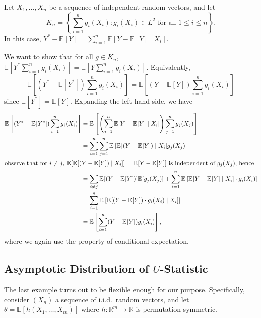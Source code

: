 \begin{eg}\label{eg:projection}
	Let \(X_1, \dots , X_n\) be a sequence of independent random vectors, and let
	\[
		K_n = \left\{ \sum_{i=1}^{n} g_i(X_i) \colon g_i(X_i) \in L^2 \text{ for all } 1 \leq i \leq n \right\}.
	\]
	In this case, \(Y^{\ast} - \mathbb{E}_{}[Y] = \sum_{i=1}^{n} \mathbb{E}_{}[Y - \mathbb{E}_{}[Y] \mid X_i] \).
\end{eg}
\begin{explanation}
	We want to show that for all \(g \in K_n\), \(\mathbb{E}_{}[Y^{\ast} \sum_{i=1}^{n} g_i(X_i)] = \mathbb{E}_{}[Y \sum_{i=1}^{n} g_i(X_i)] \). Equivalently,
	\[
		\mathbb{E}_{}\left[(Y^{\ast} - \mathbb{E}_{}[Y^{\ast} ] ) \sum_{i=1}^{n} g_i(X_i)\right]
		= \mathbb{E}_{}\left[(Y - \mathbb{E}_{}[Y] ) \sum_{i=1}^{n} g_i(X_i)\right]
	\]
	since \(\mathbb{E}_{}[Y^{\ast} ] = \mathbb{E}_{}[Y] \). Expanding the left-hand side, we have
	\begin{align*}
		\mathbb{E}_{}\left[(Y^{\ast} - \mathbb{E}_{}[Y^{\ast} ] ) \sum_{i=1}^{n} g_i(X_i)\right]
		 & = \mathbb{E}_{}\left[\left( \sum_{i=1}^{n} \mathbb{E}_{}[Y - \mathbb{E}_{}[Y] \mid X_i] \right) \sum_{j=1}^{n} g_j(X_j)\right]                                                            \\
		 & = \sum_{i=1}^{n} \sum_{j=1}^{n} \mathbb{E}_{}\left[\mathbb{E}_{}[(Y - \mathbb{E}_{}[Y] ) \mid X_i] g_j(X_j) \right]                                                                       \\
		\shortintertext{observe that for \(i\neq j\), \(\mathbb{E}_{}[\mathbb{E}_{}[(Y - \mathbb{E}_{}[Y] ) \mid X_i ]] = \mathbb{E}_{}[Y - \mathbb{E}_{}[Y] ] \) is independent of \(g_j(X_j)\), hence}
		 & = \sum_{i \neq j} \mathbb{E}_{}[(Y - \mathbb{E}_{}[Y] ) ] \mathbb{E}_{}[g_j(X_j) ] + \sum_{i=1}^{n} \mathbb{E}_{}\left[\mathbb{E}_{}[Y - \mathbb{E}_{}[Y] \mid X_i] \cdot g_i(X_i)\right] \\
		 & =  \sum_{i=1}^{n} \mathbb{E}_{}\left[\mathbb{E}_{}[(Y - \mathbb{E}_{}[Y]) \cdot g_i(X_i) \mid X_i]\right]                                                                                 \\
		 & = \mathbb{E}_{}\left[\sum_{i=1}^{n} (Y - \mathbb{E}_{}[Y] ) g_i(X_i) \right],
	\end{align*}
	where we again use the property of conditional expectation.
\end{explanation}

\subsection{Asymptotic Distribution of \(U\)-Statistic}
The last example turns out to be flexible enough for our purpose. Specifically, consider \((X_n)\) a sequence of i.i.d.\ random vectors, and let \(\theta = \mathbb{E}_{}[h(X_1, \dots , X_m)] \) where \(h \colon \mathbb{R} ^m \to \mathbb{R} \) is permutation symmetric.

